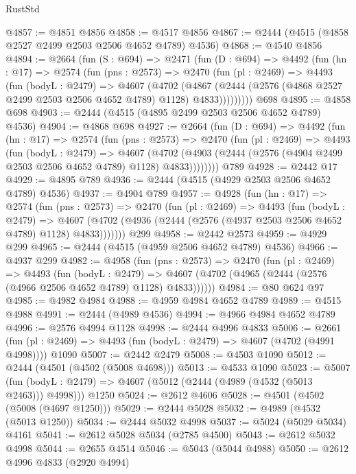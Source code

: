 \begin{lexlean}{RustStd}
\begin{coremodule}
@4857 := @4851 @4856
@4858 := @4517 @4856
@4867 := @2444 (@4515 (@4858 @2527 @2499 @2503 @2506 @4652 @4789) @4536)
@4868 := @4540 @4856
@4894 := @2664
    (fun (S : @694) =>
    @2471
      (fun (D : @694) =>
      @4492
        (fun (hn : @17) =>
        @2574
          (fun (pns : @2573) =>
          @2470
            (fun (pl : @2469) =>
            @4493
              (fun (bodyL : @2479) =>
              @4607
                (@4702
                  (@4867
                    (@2444 (@2576 (@4868 @2527 @2499 @2503 @2506 @4652 @4789) @1128) @4833)))))))))
    @698
@4895 := @4858 @698
@4903 := @2444 (@4515 (@4895 @2499 @2503 @2506 @4652 @4789) @4536)
@4904 := @4868 @698
@4927 := @2664
    (fun (D : @694) =>
    @4492
      (fun (hn : @17) =>
      @2574
        (fun (pns : @2573) =>
        @2470
          (fun (pl : @2469) =>
          @4493
            (fun (bodyL : @2479) =>
            @4607
              (@4702 (@4903 (@2444 (@2576 (@4904 @2499 @2503 @2506 @4652 @4789) @1128) @4833))))))))
    @789
@4928 := @2442 @17
@4929 := @4895 @789
@4936 := @2444 (@4515 (@4929 @2503 @2506 @4652 @4789) @4536)
@4937 := @4904 @789
@4957 := @4928
    (fun (hn : @17) =>
    @2574
      (fun (pns : @2573) =>
      @2470
        (fun (pl : @2469) =>
        @4493
          (fun (bodyL : @2479) =>
          @4607 (@4702 (@4936 (@2444 (@2576 (@4937 @2503 @2506 @4652 @4789) @1128) @4833)))))))
    @299
@4958 := @2442 @2573
@4959 := @4929 @299
@4965 := @2444 (@4515 (@4959 @2506 @4652 @4789) @4536)
@4966 := @4937 @299
@4982 := @4958
    (fun (pns : @2573) =>
    @2470
      (fun (pl : @2469) =>
      @4493
        (fun (bodyL : @2479) =>
        @4607 (@4702 (@4965 (@2444 (@2576 (@4966 @2506 @4652 @4789) @1128) @4833))))))
@4984 := @80 @624 @97
@4985 := @4982 @4984
@4988 := @4959 @4984 @4652 @4789
@4989 := @4515 @4988
@4991 := @2444 (@4989 @4536)
@4994 := @4966 @4984 @4652 @4789
@4996 := @2576 @4994 @1128
@4998 := @2444 @4996 @4833
@5006 := @2661
    (fun (pl : @2469) => @4493 (fun (bodyL : @2479) => @4607 (@4702 (@4991 @4998))))
    @1090
@5007 := @2442 @2479
@5008 := @4503 @1090
@5012 := @2444 (@4501 (@4502 (@5008 @4698)))
@5013 := @4533 @1090
@5023 := @5007
    (fun (bodyL : @2479) => @4607 (@5012 (@2444 (@4989 (@4532 (@5013 @2463))) @4998)))
    @1250
@5024 := @2612 @4606
@5028 := @4501 (@4502 (@5008 (@4697 @1250)))
@5029 := @2444 @5028
@5032 := @4989 (@4532 (@5013 @1250))
@5034 := @2444 @5032 @4998
@5037 := @5024 (@5029 @5034) @4161
@5041 := @2612 @5028 @5034 (@2785 @4500)
@5043 := @2612 @5032 @4998
@5044 := @2655 @4514
@5046 := @5043 (@5044 @4988)
@5050 := @2612 @4996 @4833 (@2920 @4994)

\end{coremodule}
\end{lexlean}
